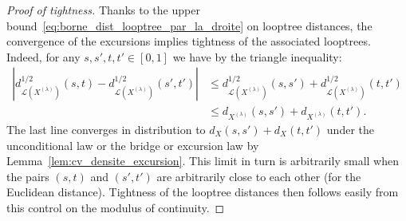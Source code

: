\documentclass[british, a4paper,11pt]{article}
\numberwithin{equation}{section}
\theoremstyle{definition}
\newcommand{\Loop}{\mathscr{L}}
\begin{document}
\begin{proof}[Proof of tightness]
Thanks to the upper bound~\eqref{eq:borne_dist_looptree_par_la_droite} on looptree distances, the convergence of the excursions implies tightness of the associated looptrees. 
Indeed, for any $s, s', t, t' \in [0,1]$ we have by the triangle inequality:
\begin{align*}
|d^{1/2}_{\Loop(X^{(\lambda)})}(s,t) - d^{1/2}_{\Loop(X^{(\lambda)})}(s',t')|
&\leq d^{1/2}_{\Loop(X^{(\lambda)})}(s,s') + d^{1/2}_{\Loop(X^{(\lambda)})}(t,t')
\\
&\leq d_{X^{(\lambda)}}(s,s') + d_{X^{(\lambda)}}(t,t')
.\end{align*}
The last line converges in distribution to $d_{X}(s,s') + d_{X}(t,t')$ under the unconditional law or the bridge or excursion law by Lemma~\ref{lem:cv_densite_excursion}. This limit in turn is arbitrarily small when the pairs $(s,t)$ and $(s',t')$ are arbitrarily close to each other (for the Euclidean distance). Tightness of the looptree distances then follows easily from this control on the modulus of continuity.


\end{proof}
\end{document}
